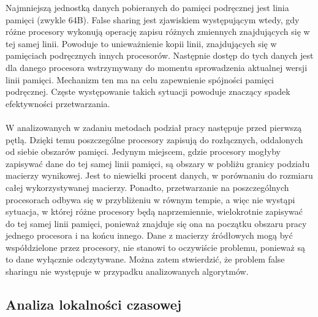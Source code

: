 \documentclass[12pt,a4paper]{article}
\begin{document}
Najmniejszą jednostką danych pobieranych do pamięci podręcznej jest linia pamięci (zwykle 64B). False sharing jest zjawiskiem występującym wtedy, gdy różne procesory wykonują operację zapisu różnych zmiennych znajdujących się w tej samej linii. Powoduje to unieważnienie kopii linii, znajdujących się w pamięciach podręcznych innych procesorów. Następnie dostęp do tych danych jest dla danego procesora wstrzymywany do momentu sprowadzenia aktualnej wersji linii pamięci. Mechanizm ten ma na celu zapewnienie spójności pamięci podręcznej. Częste występowanie takich sytuacji powoduje znaczący spadek efektywności przetwarzania.\\
\\
W analizowanych w zadaniu metodach podział pracy następuje przed pierwszą pętlą. Dzięki temu poszczególne procesory zapisują do rozłącznych, oddalonych od siebie obszarów pamięci. Jedynym miejscem, gdzie procesory mogłyby zapisywać dane do tej samej linii pamięci, są obszary w pobliżu granicy podziału macierzy wynikowej. Jest to niewielki procent danych, w porównaniu do rozmiaru całej wykorzystywanej macierzy. Ponadto, przetwarzanie na poszczególnych procesorach odbywa się w przybliżeniu w równym tempie, a więc nie wystąpi sytuacja, w której różne procesory będą naprzemiennie, wielokrotnie zapisywać do tej samej linii pamięci, ponieważ znajduje się ona na początku obszaru pracy jednego procesora i na końcu innego. Dane z macierzy źródłowych mogą być współdzielone przez procesory, nie stanowi to oczywiście problemu, ponieważ są to dane wyłącznie odczytywane. Można zatem stwierdzić, że problem false sharingu nie występuje w przypadku analizowanych algorytmów.

\subsection{Analiza lokalności czasowej}
\end{document}
